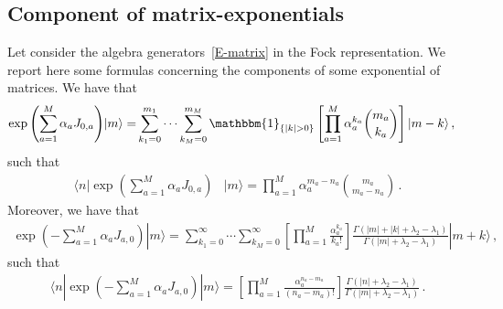 \documentclass[11pt]{article}
\numberwithin{equation}{section}
\newcommand{\M}{M}
\begin{document}
 									\subsection{Component of matrix-exponentials}
Let consider the algebra generators~\eqref{E-matrix} in the Fock representation. We report here some formulas concerning the components of some exponential of matrices.
We have that 
\begin{align}
	\exp{\left(\sum_{a=1}^{\M}\alpha_{a}J_{0,a}\right)}|m\rangle=&
	\sum_{k_{1}=0}^{m_{1}}\cdots\sum_{k_{\M}=0}^{m_{\M}}\mathbbm{1}_{\{|k|>0\}}\left[\prod_{a=1}^{\M}\alpha_{a}^{k_{a}}\binom{m_{a}}{k_{a}}\right]|m-k\rangle\,,
\end{align}
such that
\begin{align}\label{exponential-annhilation}
	\langle n|\exp{\left(\sum_{a=1}^{\M}\alpha_{a}J_{0,a}\right)}&|m\rangle=\prod_{a=1}^{\M}\alpha_{a}^{m_a-n_a}\binom{m_{a}}{m_{a}-n_a} \,.
\end{align}
Moreover, we have that 
\begin{align}
	\exp{\left(-\sum_{a=1}^{\M}\alpha_{a}J_{a,0}\right)}|m\rangle=
	\sum_{k_{1}=0}^{\infty}\cdots\sum_{k_{\M}=0}^{\infty}\left[\prod_{a=1}^{\M}\frac{\alpha_{a}^{k_{a}}}{k_{a}! }\right]\frac{\Gamma(|m|+|k|+\lambda_2-\lambda_1)}{\Gamma(|m|+\lambda_2-\lambda_1)}|m+k\rangle\,,
\end{align}
such that
\begin{align}\label{mp1right}
	\langle n|\exp{\left(-\sum_{a=1}^{\M}\alpha_{a}J_{a,0}\right)}|m\rangle=\left[\prod_{a=1}^{\M}\frac{\alpha_{a}^{n_{a}-m_a}}{(n_{a}-m_a)! }\right]\frac{\Gamma(|n|+\lambda_2-\lambda_1)}{\Gamma(|m|+\lambda_2-\lambda_1)}\,.
 \end{align}











  		  																																													       





\end{document}
